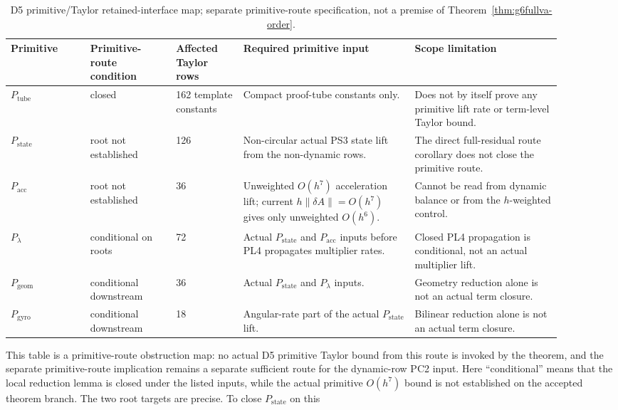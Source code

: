 \documentclass[preprint,12pt]{elsarticle}
\begin{document}
\begin{table}[htbp]
\centering
\small
\setlength{\tabcolsep}{2pt}
\caption{D5 primitive/Taylor retained-interface map; separate primitive-route
specification, not a
premise of Theorem~\ref{thm:g6fullva-order}.}
\label{tab:d5-primitive-blocker-ledger}
\begin{tabular}{@{}P{0.13\linewidth}P{0.14\linewidth}P{0.11\linewidth}P{0.28\linewidth}P{0.24\linewidth}@{}}
\toprule
Primitive & Primitive-route condition & Affected Taylor rows & Required primitive input & Scope limitation \\
\midrule
\(P_{\mathrm{tube}}\) & closed & 162 template constants &
Compact proof-tube constants only. &
Does not by itself prove any primitive lift rate or term-level Taylor bound. \\
\(P_{\mathrm{state}}\) & root not established & 126 &
Non-circular actual PS3 state lift from the non-dynamic rows. &
The direct full-residual route corollary does not close the primitive route. \\
\(P_{\mathrm{acc}}\) & root not established & 36 &
Unweighted \(O(h^7)\) acceleration lift; current
\(h\|\delta A\|=O(h^7)\) gives only unweighted \(O(h^6)\). &
Cannot be read from dynamic balance or from the \(h\)-weighted control. \\
\(P_{\lambda}\) & conditional on roots & 72 &
Actual \(P_{\mathrm{state}}\) and \(P_{\mathrm{acc}}\) inputs before PL4
propagates multiplier rates. &
Closed PL4 propagation is conditional, not an actual multiplier lift. \\
\(P_{\mathrm{geom}}\) & conditional downstream & 36 &
Actual \(P_{\mathrm{state}}\) and \(P_{\lambda}\) inputs. &
Geometry reduction alone is not an actual term closure. \\
\(P_{\mathrm{gyro}}\) & conditional downstream & 18 &
Angular-rate part of the actual \(P_{\mathrm{state}}\) lift. &
Bilinear reduction alone is not an actual term closure. \\
\bottomrule
\end{tabular}
\end{table}
This table is a primitive-route obstruction map: no actual D5 primitive
Taylor bound from this route is invoked by the theorem, and the separate
primitive-route implication remains a separate sufficient route for the
dynamic-row PC2 input.
Here ``conditional'' means that the local reduction lemma is closed under
the listed inputs, while the actual primitive \(O(h^7)\) bound is not
established on the accepted theorem branch.
The two root targets are precise.  To close \(P_{\mathrm{state}}\) on this
\end{document}
